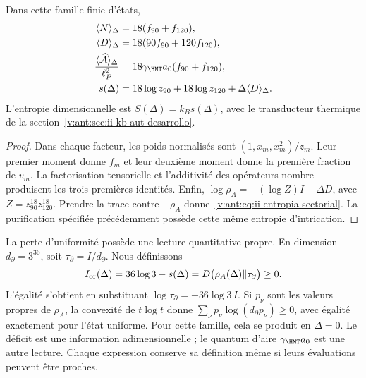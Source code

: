 \begin{proposition}
Dans cette famille finie d’états,
\begin{align}
 \langle N\rangle_\Delta&=18(f_{90}+f_{120}),\\
 \langle D\rangle_\Delta&=18(90f_{90}+120f_{120}),\\
 \frac{\langle\widehat{\mathcal A}\rangle_\Delta}{\ell_P^2}
 &=18\gamma_{\HMT}a_0(f_{90}+f_{120}),
 \label{v:ant:eq:ii-area-media}\\
 s(\Delta)&=18\log z_{90}+18\log z_{120}
                  +\Delta\langle D\rangle_\Delta.
 \label{v:ant:eq:ii-entropia-sectorial}
\end{align}
L'entropie dimensionnelle est $S(\Delta)=k_Bs(\Delta)$, avec le
transducteur thermique de la section~\ref{v:ant:sec:ii-kb-aut-desarrollo}.
\end{proposition}
\begin{proof}
Dans chaque facteur, les poids normalisés sont
$(1,x_m,x_m^2)/z_m$. Leur premier moment donne $f_m$ et leur deuxième
moment donne la première fraction de $v_m$. La factorisation tensorielle
et l'additivité des opérateurs nombre produisent les trois premières
identités. Enfin,
$\log\rho_A=-(\log Z)I-\Delta D$, avec
$Z=z_{90}^{18}z_{120}^{18}$. Prendre la trace contre $-\rho_A$
donne~\eqref{v:ant:eq:ii-entropia-sectorial}. La purification spécifiée
précédemment possède cette même entropie d'intrication.
\end{proof}

La perte d'uniformité possède une lecture quantitative propre.
En dimension \(d_\partial=3^{36}\), soit
\(\tau_\partial=I/d_\partial\). Nous définissons
\begin{equation}
 I_{\rm or}(\Delta)=36\log3-s(\Delta)
 =D\bigl(\rho_A(\Delta)\Vert\tau_\partial\bigr)\ge0.
 \label{v:ant:eq:ii-area-deficit-informacional}
\end{equation}
L’égalité s’obtient en substituant
\(\log\tau_\partial=-36\log3\,I\). Si \(p_\nu\) sont les
valeurs propres de \(\rho_A\), la convexité de \(t\log t\) donne
\(\sum_\nu p_\nu\log(d_\partial p_\nu)\ge0\), avec égalité
exactement pour l’état uniforme. Pour cette famille, cela se produit en
\(\Delta=0\). Le déficit est une information adimensionnelle ; le quantum
d’aire \(\gamma_{\HMT}a_0\) est une autre lecture. Chaque expression conserve
sa définition même si leurs évaluations peuvent être proches.

